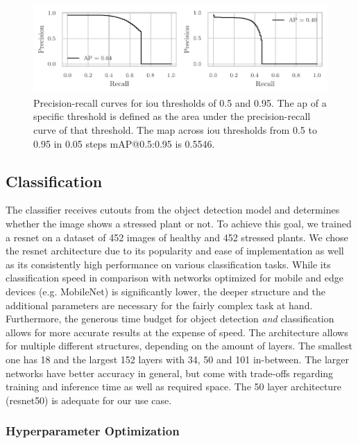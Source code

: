 \documentclass[draft,final]{vutinfth} %
\begin{document}
\begin{figure}
  \centering
  \includegraphics{graphics/APpt5-pt95-final.pdf}
  \caption[Hyper-parameter optimized object detection AP@0.5 and
  AP@0.95.]{Precision-recall curves for \gls{iou} thresholds of 0.5
    and 0.95. The \gls{ap} of a specific threshold is defined as the
    area under the precision-recall curve of that threshold. The
    \gls{map} across \gls{iou} thresholds from 0.5 to 0.95 in 0.05
    steps \textsf{mAP}@0.5:0.95 is 0.5546.}
  \label{fig:yolo-ap-hyp}
\end{figure}

\subsection{Classification}
\label{ssec:classifier-eval}

The classifier receives cutouts from the object detection model and
determines whether the image shows a stressed plant or not. To achieve
this goal, we trained a \gls{resnet} \cite{he2016} on a dataset of 452
images of healthy and 452 stressed plants. We chose the \gls{resnet}
architecture due to its popularity and ease of implementation as well
as its consistently high performance on various classification
tasks. While its classification speed in comparison with networks
optimized for mobile and edge devices (e.g. MobileNet) is
significantly lower, the deeper structure and the additional
parameters are necessary for the fairly complex task at
hand. Furthermore, the generous time budget for object detection
\emph{and} classification allows for more accurate results at the
expense of speed. The architecture allows for multiple different
structures, depending on the amount of layers. The smallest one has 18
and the largest 152 layers with 34, 50 and 101 in-between. The larger
networks have better accuracy in general, but come with trade-offs
regarding training and inference time as well as required space. The
50 layer architecture (\gls{resnet}50) is adequate for our use case.

\subsubsection{Hyperparameter Optimization}
\label{sssec:classifier-hyp-opt}
\end{document}
